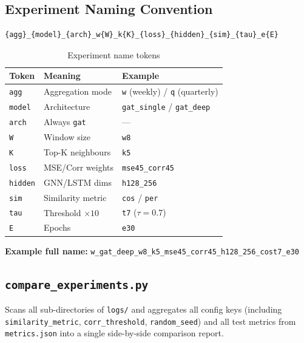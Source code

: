 \documentclass[12pt,a4paper]{article}
\newcommand{\codeinline}[1]{\texttt{\small #1}}
\begin{document}
\subsection{Experiment Naming Convention}

\begin{lstlisting}
{agg}_{model}_{arch}_w{W}_k{K}_{loss}_{hidden}_{sim}_{tau}_e{E}
\end{lstlisting}

\begin{table}[H]
\centering
\begin{tabular}{L{2cm} L{5cm} L{4cm}}
\toprule
\textbf{Token} & \textbf{Meaning} & \textbf{Example} \\
\midrule
\codeinline{agg}   & Aggregation mode         & \codeinline{w} (weekly) / \codeinline{q} (quarterly) \\
\codeinline{model} & Architecture             & \codeinline{gat\_single} / \codeinline{gat\_deep} \\
\codeinline{arch}  & Always \codeinline{gat}  & — \\
\codeinline{W}     & Window size              & \codeinline{w8} \\
\codeinline{K}     & Top-K neighbours         & \codeinline{k5} \\
\codeinline{loss}  & MSE/Corr weights         & \codeinline{mse45\_corr45} \\
\codeinline{hidden}& GNN/LSTM dims            & \codeinline{h128\_256} \\
\codeinline{sim}   & Similarity metric        & \codeinline{cos} / \codeinline{per} \\
\codeinline{tau}   & Threshold $\times 10$    & \codeinline{t7} ($\tau=0.7$) \\
\codeinline{E}     & Epochs                   & \codeinline{e30} \\
\bottomrule
\end{tabular}
\caption{Experiment name tokens}
\end{table}

\textbf{Example full name:} \codeinline{w\_gat\_deep\_w8\_k5\_mse45\_corr45\_h128\_256\_cost7\_e30}

\subsection{\texttt{compare\_experiments.py}}
Scans all sub-directories of \codeinline{logs/} and aggregates all config keys (including \codeinline{similarity\_metric}, \codeinline{corr\_threshold}, \codeinline{random\_seed}) and all test metrics from \codeinline{metrics.json} into a single side-by-side comparison report.
\end{document}
